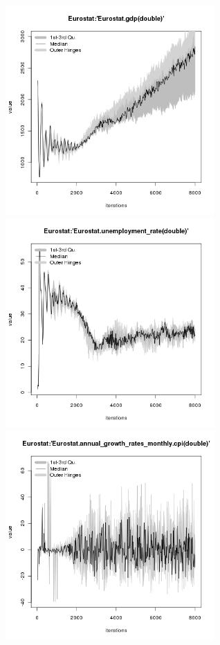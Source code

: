 
\begin{figure}[ht!]
\centering\leavevmode
\begin{minipage}{17cm}
\centering\leavevmode
\includegraphics[width=8cm]{./transient/tax_0.05/Eurostat-gdp.png}
\includegraphics[width=8cm]{./transient/tax_0.05/Eurostat-unemployment_rate.png}\\
\includegraphics[width=8cm]{./transient/tax_0.05/Eurostat-cpi.png}

\end{minipage}
\end{figure}
